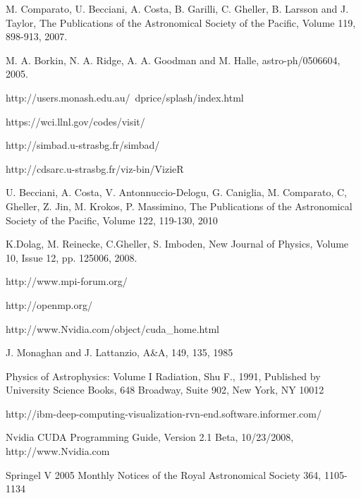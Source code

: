 \documentclass[1p,times]{elsarticle}
\begin{document}
\begin{thebibliography}{00}
M. Comparato, U. Becciani, A. Costa, B. Garilli, C. Gheller, B. Larsson and J. Taylor, 
The Publications of the Astronomical Society of the Pacific, Volume 119, 898-913, 2007.

 M. A. Borkin, N. A. Ridge, A. A. Goodman and M. Halle, astro-ph/0506604, 2005.

 http://users.monash.edu.au/~dprice/splash/index.html

 https://wci.llnl.gov/codes/visit/

 http://simbad.u-strasbg.fr/simbad/

 http://cdsarc.u-strasbg.fr/viz-bin/VizieR

U. Becciani, A. Costa, V. Antonnuccio-Delogu, G. Caniglia, M. Comparato, 
C, Gheller, Z. Jin, M. Krokos, P. Massimino, The Publications of the Astronomical Society of the Pacific, 
Volume 122, 119-130, 2010

K.Dolag, M. Reinecke, C.Gheller, S. Imboden, 
New Journal of Physics, Volume 10, Issue 12, pp. 125006, 2008.

 http://www.mpi-forum.org/

 http://openmp.org/

 http://www.Nvidia.com/object/cuda\_home.html

 J. Monaghan and J. Lattanzio, A\&A, 149, 135, 1985

 Physics of Astrophysics: Volume I Radiation, Shu F., 1991,
Published by University Science Books, 648 Broadway, Suite 902, New York, NY 10012

 http://ibm-deep-computing-visualization-rvn-end.software.informer.com/

 Nvidia CUDA Programming Guide, Version 2.1 Beta, 10/23/2008, http://www.Nvidia.com

 Springel V 2005 Monthly Notices of the Royal Astronomical Society 364, 1105-1134

\end{thebibliography}
\end{document}
